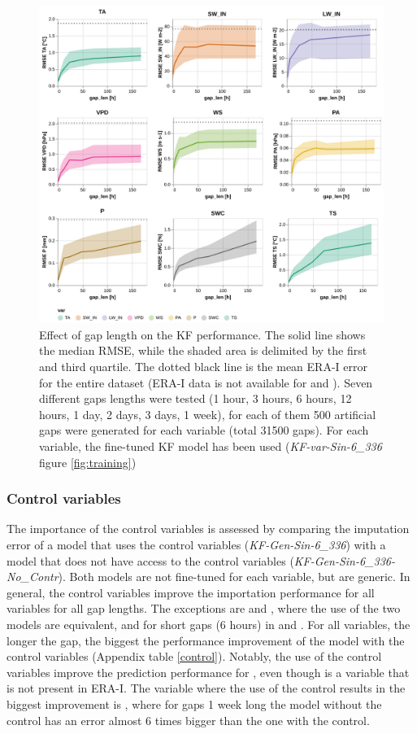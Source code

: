 \documentclass{article}
\newcommand{\imgwidth}{6in}
\begin{document}
\begin{figure}
\centerline{\includegraphics[width=\imgwidth]{images2/gap_len}}
\caption{Effect of gap length on the KF performance. The solid line shows the median RMSE, while the shaded area is delimited by the first and third quartile. The dotted black line is the mean ERA-I error for the entire dataset (ERA-I data is not available for  and ). Seven different gaps lengths were tested (1 hour, 3 hours, 6 hours, 12 hours, 1 day, 2 days, 3 days, 1 week), for each of them 500 artificial gaps were generated for each variable (total 31500 gaps). For each variable, the fine-tuned KF model has been used (\textit{KF-\textlangle var\textrangle-Sin-6\_336} figure \ref{fig:training})}
\label{fig:gap_len}
\end{figure}


\subsubsection{Control variables}

The importance of the control variables is assessed by comparing the imputation error of a model that uses the control variables (\textit{KF-Gen-Sin-6\_336}) with a model that does not have access to the control variables (\textit{KF-Gen-Sin-6\_336-No\_Contr}). Both models are not fine-tuned for each variable, but are generic.
In general, the control variables improve the importation performance for all variables for all gap lengths. The exceptions are  and , where the use of the two models are equivalent, and for short gaps (6 hours) in  and .
For all variables, the longer the gap, the biggest the performance improvement of the model with the control variables (Appendix table \ref{control}). Notably, the use of the control variables improve the prediction performance for , even though is a variable that is not present in ERA-I.
The variable where the use of the control results in the biggest improvement is , where for gaps 1 week long the model without the control has an error almost 6 times bigger than the one with the control.
\end{document}
